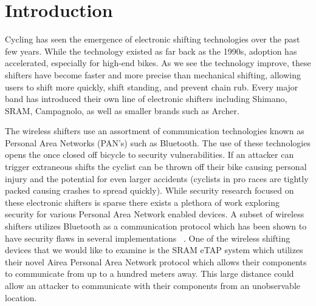 \documentclass[letterpaper,twocolumn,10pt]{article}
\begin{document}

\section{Introduction}



Cycling has seen the emergence of electronic shifting technologies over the past few years. While the technology existed as far back as the 1990s, adoption has accelerated, especially for high-end bikes. As we see the technology improve, these shifters have become faster and more precise than mechanical shifting, allowing users to shift more quickly, shift standing, and prevent chain rub. Every major band has introduced their own line of electronic shifters including Shimano, SRAM, Campagnolo, as well as smaller brands such as Archer.

The wireless shifters use an assortment of communication technologies known as Personal Area Networks (PAN’s) such as Bluetooth. The use of these technologies opens the once closed off bicycle to security vulnerabilities. If an attacker can trigger extraneous shifts the cyclist can be thrown off their bike causing personal injury and the potential for even larger accidents (cyclists in pro races are tightly packed causing crashes to spread quickly). While security research focused on these electronic shifters is sparse there exists a plethora of work exploring security for various Personal Area Network enabled devices. A subset of wireless shifters utilizes Bluetooth as a communication protocol which has been shown to have security flaws in several implementations~ \cite{JiWu}. One of the wireless shifting devices that we would like to examine is the SRAM eTAP system which utilizes their novel Airea Personal Area Network protocol which allows their components to communicate from up to a hundred meters away. This large distance could allow an attacker to communicate with their components from an unobservable location.
\end{document}
